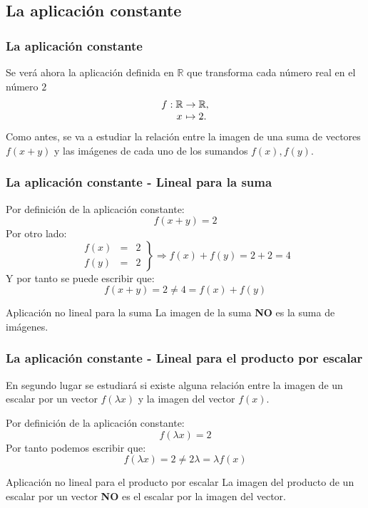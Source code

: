 \documentclass{beamer}
\begin{document}
\subsection{La aplicaci\'on constante}
\begin{frame}
  \frametitle{La aplicaci\'on constante}

Se ver\'a ahora la aplicaci\'on definida en $\mathbb R$ que transforma cada n\'umero real en el n\'umero $2$  
  \[
  \begin{array}{@{}r@{\;}c@{\;}c@{\;}l@{}}
    f: & \mathbb R & \rightarrow & \mathbb R,   \\
       & x & \mapsto     & 2.
  \end{array}
\]
Como antes, se va a estudiar la relaci\'on entre la imagen de una suma de vectores $f(x+y)$ y las im\'agenes de cada uno de los sumandos $f(x),f(y)$. 

\end{frame}


\begin{frame}
  \frametitle{La aplicaci\'on constante - Lineal para la suma}

Por definici\'on de la aplicaci\'on constante:  
  \[
f(x+y) = 2
\]
Por otro lado:
\[\left.\begin{array}{ccc}f(x) & = & 2 \\f(y) & =  & 2\end{array}\right\} \Rightarrow f(x)+f(y) = 2+2=4\]
Y por tanto se puede escribir que:
\[f(x+y) = 2  \neq 4 = f(x)+f(y)\]
 \begin{block}{Aplicaci\'on no lineal para la suma}
La imagen de la suma \textbf{NO} es la suma de im\'agenes.
\end{block}

\end{frame}

\begin{frame}
  \frametitle{La aplicaci\'on constante - Lineal para el producto por escalar}

En segundo lugar se estudiar\'a si existe alguna relaci\'on entre la imagen de un escalar por un vector $f(\lambda x)$ y la imagen del vector $f(x)$. 

Por definici\'on de la aplicaci\'on constante:
  \[
f(\lambda x) = 2
\]
Por tanto podemos escribir que:
\[f(\lambda x) = 2 \neq 2 \lambda = \lambda f(x)\]
 \begin{block}{Aplicaci\'on no lineal para el producto por escalar}
La imagen del producto de un escalar por un vector \textbf{NO} es el escalar por la imagen del vector.
\end{block}
\end{frame}
\end{document}
